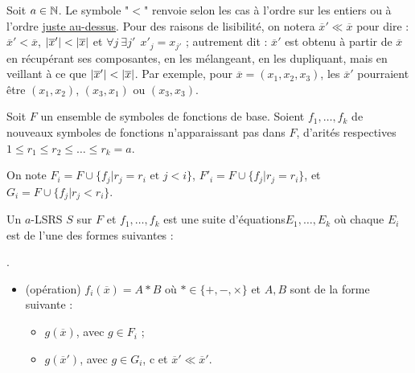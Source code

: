 			Soit $a \in \mathbb{N}$. Le symbole "$<$" renvoie selon les cas à l'ordre sur les entiers ou à l'ordre \hyperref[def:bon_ordre_sur_uplets]{juste au-dessus}. Pour des raisons de lisibilité, on notera $\overline{x}' \ll \overline{x}$ pour dire :  $\overline{x}' < \overline{x}$, $\left|\overline{x}'\right| < \left|\overline{x}\right|$ et $\forall j \: \exists j' \:\: x'_j = x_{j'}$ ; autrement dit : $\overline{x}'$ est obtenu à partir de $\overline{x}$ en récupérant ses composantes, en les mélangeant, en les dupliquant, mais en veillant à ce que $\left|\overline{x}'\right| < \left|\overline{x}\right|$. Par exemple, pour $\overline{x} = (x_1, x_2, x_3)$, les $\overline{x}'$ pourraient être $(x_1, x_2)$, $(x_3, x_1)$ ou $(x_3, x_3)$.
			
			\begin{definition}[$a$-LSRS]
				\label{def:aLSRS}
				Soit $F$ un ensemble de symboles de fonctions de base. Soient $f_1, \dots, f_k$ de nouveaux symboles de fonctions n'apparaissant pas dans $F$, d'arités respectives $1 \leqslant r_1 \leqslant r_2 \leqslant \dots \leqslant r_k = a$.
				
				On note $F_i = F \cup \{f_j | r_j = r_i \text{ et } j < i\}$, $F'_i = F \cup \{f_j | r_j = r_i\}$, et $G_i = F \cup \{ f_j | r_j < r_i\}$\footnotemark.
				
					
				Un $a$-LSRS $S$ sur $F$ et $f_1, \dots, f_k$ est une suite d'équations\footnotemark $E_1, \dots, E_k$ où chaque $E_i$ est de l'une des formes suivantes :
					
					.
				
				\begin{itemize}[itemsep=-1mm]
					\item	(opération) 	$f_i\left(\overline{x}\right) = A * B$ où $* \in \{+,-,\times\}$ et $A, B$ sont de la forme suivante : 
							\begin{itemize}[itemsep=-1mm]
								\item 	$g\left(\overline{x}\right)$, avec $g \in F_i$ ;
								\item 	$g\left(\overline{x}'\right)$, avec $g \in G_i$, c et $\overline{x}' \ll \overline{x}'$.
							\end{itemize}
										

\end{itemize}
\end{definition}
